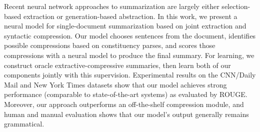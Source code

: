 Recent neural network approaches to summarization are largely either selection-based extraction or generation-based abstraction. In this work, we present a neural model for single-document summarization based on joint extraction and syntactic compression. Our model chooses sentences from the document, identifies possible compressions based on constituency parses, and scores those compressions with a neural model to produce the final summary. For learning, we construct oracle extractive-compressive summaries, then learn both of our components jointly with this supervision. Experimental results on the CNN/Daily Mail and New York Times datasets show that our model achieves strong performance (comparable to state-of-the-art systems) as evaluated by ROUGE. Moreover, our approach outperforms an off-the-shelf compression module, and human and manual evaluation shows that our model's output generally remains grammatical.
